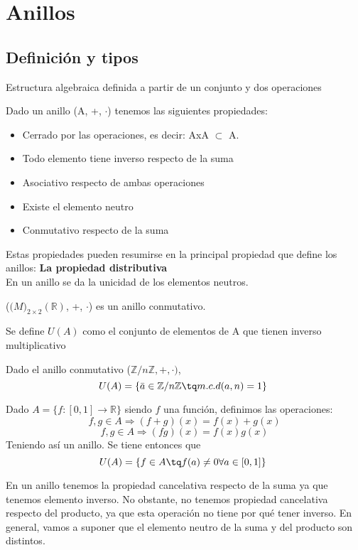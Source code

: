 \documentclass[nochap]{apuntes}
\begin{document}
\section{Anillos}
\subsection{Definición y tipos}
\begin{defn}[Anillo]
 Estructura algebraica definida a partir de un conjunto y dos operaciones
\end{defn}
Dado un anillo (A, +, $\cdot$) tenemos las siguientes propiedades:
\begin{itemize}
 \item Cerrado por las operaciones, es decir: AxA $\subset$ A.
 \item Todo elemento tiene inverso respecto de la suma
 \item Asociativo respecto de ambas operaciones
 \item Existe el elemento neutro
 \item Conmutativo respecto de la suma
\end{itemize}
Estas propiedades pueden resumirse en la principal propiedad que define los anillos: \textbf{La propiedad distributiva}\\
En un anillo se da la unicidad de los elementos neutros.
\begin{example}
 ($\mathbb(M)_{2\times 2}(\mathbb{R})$, +, $\cdot$) es un anillo conmutativo.
\end{example}

\begin{defn}[Unidades]
 Se define $U(A)$ como  el conjunto de elementos de A que tienen inverso multiplicativo
\end{defn}

\begin{example}
 Dado el anillo conmutativo ($\mathbb{Z}/n\mathbb{Z},+,\cdot)$, \[ U(A)=\{\bar{a}\in\mathbb{Z}/n\mathbb{Z} \tq m.c.d(a,n)=1\} \]
\end{example}

\begin{example}
 Dado $A=\{f:[0,1] \rightarrow \mathbb{R}\}$  siendo $f$ una función, definimos las operaciones:
 \[f, g \in A \Rightarrow (f+g)(x)=f(x)+g(x)\]
 \[f, g \in A \Rightarrow (fg)(x)=f(x)g(x)\]
 Teniendo así un anillo. Se tiene entonces que \[ U(A)=\{f\in A \tq f(a) \neq 0 \forall a \in [0,1]\} \]
\end{example}

En un anillo tenemos la propiedad cancelativa respecto de la suma ya que tenemos elemento inverso. No obstante, no tenemos propiedad cancelativa respecto del producto, ya que esta operación no tiene por qué tener inverso. En general, vamos a suponer que el elemento neutro de la suma y del producto son distintos.
\end{document}
